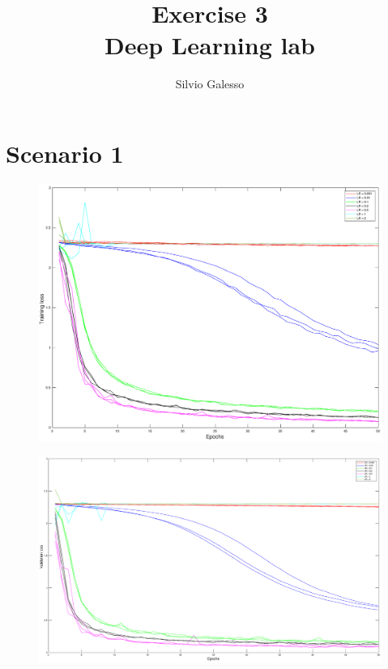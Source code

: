 \documentclass{article}
\title{  Exercise 3 \\
        \large Deep Learning lab}
\author{Silvio Galesso}
\date{}
\begin{document}
\maketitle

\section*{Scenario 1}
	\begin{figure}[!htb]
        \centering
        \includegraphics[width=\textwidth]{figures/sc1_tr_loss}
    \end{figure}
    \begin{figure}[!htb]
        \centering
        \includegraphics[width=\textwidth]{figures/sc1_val_loss}
    \end{figure}
\end{document}
